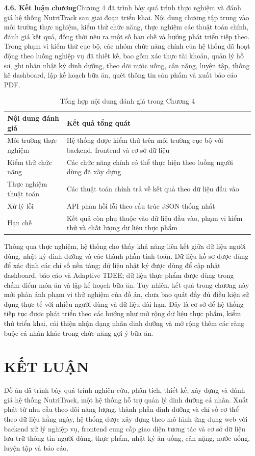 \textbf{4.6. Kết luận chương}Chương 4 đã trình bày quá trình thực nghiệm và đánh giá hệ thống NutriTrack sau giai đoạn triển khai. Nội dung chương tập trung vào môi trường thực nghiệm, kiểm thử chức năng, thực nghiệm các thuật toán chính, đánh giá kết quả, đồng thời nêu ra một số hạn chế và hướng phát triển tiếp theo. Trong phạm vi kiểm thử cục bộ, các nhóm chức năng chính của hệ thống đã hoạt động theo luồng nghiệp vụ đã thiết kế, bao gồm xác thực tài khoản, quản lý hồ sơ, ghi nhận nhật ký dinh dưỡng, theo dõi nước uống, cân nặng, luyện tập, thống kê dashboard, lập kế hoạch bữa ăn, quét thông tin sản phẩm và xuất báo cáo PDF.

\begin{table}[H]
\centering
\caption{Tổng hợp nội dung đánh giá trong Chương 4}
\begin{tabular}{|p{4cm}|p{11cm}|}
\hline
\textbf{Nội dung đánh giá} & \textbf{Kết quả tổng quát} \\ \hline
Môi trường thực nghiệm & Hệ thống được kiểm thử trên môi trường cục bộ với backend, frontend và cơ sở dữ liệu \\ \hline
Kiểm thử chức năng & Các chức năng chính có thể thực hiện theo luồng người dùng đã xây dựng \\ \hline
Thực nghiệm thuật toán & Các thuật toán chính trả về kết quả theo dữ liệu đầu vào \\ \hline
Xử lý lỗi & API phản hồi lỗi theo cấu trúc JSON thống nhất \\ \hline
Hạn chế & Kết quả còn phụ thuộc vào dữ liệu đầu vào, phạm vi kiểm thử và chất lượng dữ liệu thực phẩm \\ \hline
\end{tabular}
\end{table}

Thông qua thực nghiệm, hệ thống cho thấy khả năng liên kết giữa dữ liệu người dùng, nhật ký dinh dưỡng và các thành phần tính toán. Dữ liệu hồ sơ được dùng để xác định các chỉ số nền tảng; dữ liệu nhật ký được dùng để cập nhật dashboard, báo cáo và Adaptive TDEE; dữ liệu thực phẩm được dùng trong chấm điểm món ăn và lập kế hoạch bữa ăn. Tuy nhiên, kết quả trong chương này mới phản ánh phạm vi thử nghiệm của đồ án, chưa bao quát đầy đủ điều kiện sử dụng thực tế với nhiều người dùng và dữ liệu dài hạn. Đây là cơ sở để hệ thống tiếp tục được phát triển theo các hướng như mở rộng dữ liệu thực phẩm, kiểm thử triển khai, cải thiện nhận dạng nhãn dinh dưỡng và mở rộng thêm các ràng buộc cá nhân khác trong chức năng gợi ý bữa ăn.


\chapter*{KẾT LUẬN}
Đồ án đã trình bày quá trình nghiên cứu, phân tích, thiết kế, xây dựng và đánh giá hệ thống NutriTrack, một hệ thống hỗ trợ quản lý dinh dưỡng cá nhân. Xuất phát từ nhu cầu theo dõi năng lượng, thành phần dinh dưỡng và chỉ số cơ thể theo dữ liệu hằng ngày, hệ thống được xây dựng theo mô hình ứng dụng web với backend xử lý nghiệp vụ, frontend cung cấp giao diện tương tác và cơ sở dữ liệu lưu trữ thông tin người dùng, thực phẩm, nhật ký ăn uống, cân nặng, nước uống, luyện tập và báo cáo.

